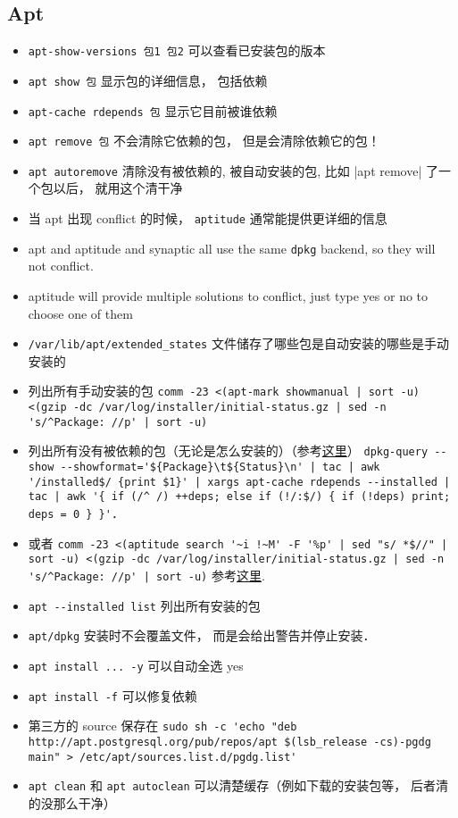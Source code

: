
\begin{issues}
\issueDraft
\end{issues}

\subsection{Apt}
\begin{itemize}
\item \verb|apt-show-versions 包1 包2| 可以查看已安装包的版本
\item \verb|apt show 包| 显示包的详细信息， 包括依赖
\item \verb|apt-cache rdepends 包| 显示它目前被谁依赖
\item \verb|apt remove 包| 不会清除它依赖的包， 但是会清除依赖它的包！
\item \verb|apt autoremove| 清除没有被依赖的, 被自动安装的包, 比如 \ver|apt remove| 了一个包以后， 就用这个清干净
\item 当 apt 出现 conflict 的时候， \verb|aptitude| 通常能提供更详细的信息
\item apt and aptitude and synaptic all use the same \verb|dpkg| backend, so they will not conflict.
\item aptitude will provide multiple solutions to conflict, just type yes or no to choose one of them
\item \verb|/var/lib/apt/extended_states| 文件储存了哪些包是自动安装的哪些是手动安装的
\item 列出所有手动安装的包 \verb`comm -23 <(apt-mark showmanual | sort -u) <(gzip -dc /var/log/installer/initial-status.gz | sed -n 's/^Package: //p' | sort -u)`
\item 列出所有没有被依赖的包（无论是怎么安装的）（参考\href{https://askubuntu.com/questions/1114733/how-do-i-list-all-packages-that-no-package-depends-on}{这里}） \verb`dpkg-query --show --showformat='${Package}\t${Status}\n' | tac | awk '/installed$/ {print $1}' | xargs apt-cache rdepends --installed | tac | awk '{ if (/^ /) ++deps; else if (!/:$/) { if (!deps) print; deps = 0 } }'`．
\item 或者 \verb`comm -23 <(aptitude search '~i !~M' -F '%p' | sed "s/ *$//" | sort -u) <(gzip -dc /var/log/installer/initial-status.gz | sed -n 's/^Package: //p' | sort -u)` 参考\href{https://askubuntu.com/questions/2389/how-to-list-manually-installed-packages}{这里}.
\item \verb|apt --installed list| 列出所有安装的包
\item \verb|apt/dpkg| 安装时不会覆盖文件， 而是会给出警告并停止安装．
\item \verb|apt install ... -y| 可以自动全选 yes
\item \verb|apt install -f| 可以修复依赖
\item 第三方的 source 保存在 \verb|sudo sh -c 'echo "deb http://apt.postgresql.org/pub/repos/apt $(lsb_release -cs)-pgdg main" > /etc/apt/sources.list.d/pgdg.list'|
\item \verb|apt clean| 和 \verb|apt autoclean| 可以清楚缓存（例如下载的安装包等， 后者清的没那么干净）
\end{itemize}

